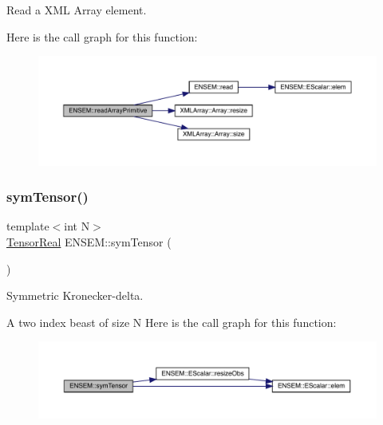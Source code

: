 Read a X\+ML Array element. 

Here is the call graph for this function\+:\nopagebreak
\begin{figure}[H]
\begin{center}
\leavevmode
\includegraphics[width=350pt]{d2/d94/namespaceENSEM_a595aa36e757c1e7259eeaf7e6421941c_cgraph}
\end{center}
\end{figure}
\mbox{\label{namespaceENSEM_a4b7b45dcc2e93e939b6662956efaf3d6}} 
\subsubsection{\texorpdfstring{symTensor()}{symTensor()}}
{\footnotesize\ttfamily template$<$int N$>$ \\
\mbox{\hyperlink{group__defs_ga958dd8b23f0fe048624bd04c42201408}{Tensor\+Real}} E\+N\+S\+E\+M\+::sym\+Tensor (\begin{DoxyParamCaption}{ }\end{DoxyParamCaption})\hspace{0.3cm}{\ttfamily [inline]}}



Symmetric Kronecker-\/delta. 

A two index beast of size N Here is the call graph for this function\+:\nopagebreak
\begin{figure}[H]
\begin{center}
\leavevmode
\includegraphics[width=350pt]{d2/d94/namespaceENSEM_a4b7b45dcc2e93e939b6662956efaf3d6_cgraph}
\end{center}
\end{figure}
\mbox{\label{namespaceENSEM_abc04e0e08f1aeecdaca3de8b916ac697}} 
